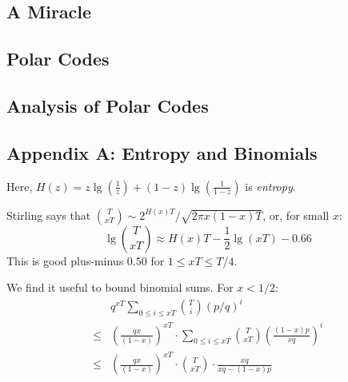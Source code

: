 \documentclass[12pt]{article}
\newcommand{\msec}[1]{\subsection*{\color{mblu}\textsf{#1}}}
\theoremstyle{definition}
\begin{document}


\msec{A Miracle}


\msec{Polar Codes}
\msec{Analysis of Polar Codes}

\msec{Appendix A: Entropy and Binomials}
    Here, $H(z) = z\lg(\frac{1}{z}) +
    (1-z)\lg(\frac{1}{1-z})$ is \emph{entropy}. 

    Stirling says that ${T \choose xT} \sim 2^{H(x)T} / \sqrt{2\pi x(1-x)T}$,
    or, for small $x$:
    $$
        \lg{{T \choose xT}} \approx H(x)T - \frac{1}{2} \lg(xT) - 0.66 
    $$
    This is good plus-minus $0.50$ for $1\leq xT\leq T/4$.

    We find it useful to bound binomial sums.  For $x < 1/2$:
    \begin{align*}
        &
        q^{xT} \sum_{0\leq i\leq xT} {T\choose i} (p/q)^{i}
        \\ \leq &
        \left(\frac{qx}{(1-x)}\right)^{xT} \cdot
        \sum_{0\leq i\leq xT} {T\choose xT} \left(\frac{(1-x)p}{xq}\right)^i 
        \\ \leq &
        \left(\frac{qx}{(1-x)}\right)^{xT} \cdot
        {T \choose xT} \cdot \frac{xq}{xq-(1-x)p} 
    \end{align*}

\end{document}
